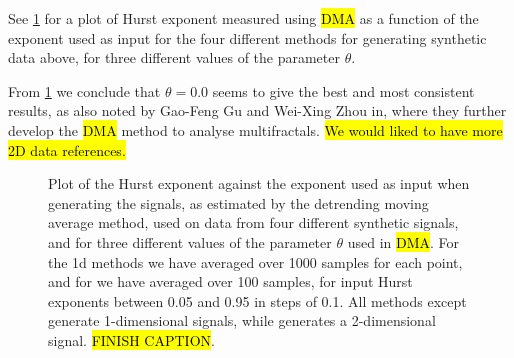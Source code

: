 See \cref{fig:dma_performace} for a plot of Hurst exponent measured using \hl{DMA} as a function of the exponent used as input for the four different methods for generating synthetic data above, for three different values of the parameter $\theta$.

From \cref{fig:dma_performace} we conclude that $\theta = 0.0$ seems to give the best and most consistent results, as also noted by Gao-Feng Gu and Wei-Xing Zhou in\cite{gu2010detrending}, where they further develop the \hl{DMA} method to analyse multifractals. \hl{We would liked to have more 2D data references.}%
%
\begin{figure}[htpb]%
    \centering%
    {
        \newcommand{\f}{\footnotesize}%
        \newcommand{\x}{\text}%
        \newcommand{\thislabelaaaaaa}{{\f $H_\x{in}=H_\x{out}$}}%
    }
    \caption{%
        Plot of the Hurst exponent against the exponent used as input when generating the signals, as estimated by the detrending moving average method, used on data from four different synthetic signals, and for three different values of the parameter $\theta$ used in \hl{DMA}. For the 1d methods we have averaged over 1000 samples for each point, and for  we have averaged over 100 samples, for input Hurst exponents between 0.05 and 0.95 in steps of 0.1. All methods except  generate 1-dimensional signals, while  generates a 2-dimensional signal. \hl{FINISH CAPTION}. %
        \label{fig:dma_performace}%
    }%
\end{figure}%

